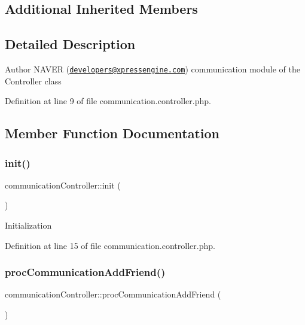 \subsection*{Additional Inherited Members}


\subsection{Detailed Description}
\begin{DoxyAuthor}{Author}
N\+A\+V\+ER (\href{mailto:developers@xpressengine.com}{\tt developers@xpressengine.\+com}) communication module of the Controller class 
\end{DoxyAuthor}


Definition at line 9 of file communication.\+controller.\+php.



\subsection{Member Function Documentation}
\mbox{\label{classcommunicationController_ae0bac4165bbba7f134ef74749c58f0df}} 
\subsubsection{\texorpdfstring{init()}{init()}}
{\footnotesize\ttfamily communication\+Controller\+::init (\begin{DoxyParamCaption}{ }\end{DoxyParamCaption})}

Initialization 

Definition at line 15 of file communication.\+controller.\+php.

\mbox{\label{classcommunicationController_a0d40e483d00a2b041578ad974fb3a5b5}} 
\subsubsection{\texorpdfstring{proc\+Communication\+Add\+Friend()}{procCommunicationAddFriend()}}
{\footnotesize\ttfamily communication\+Controller\+::proc\+Communication\+Add\+Friend (\begin{DoxyParamCaption}{ }\end{DoxyParamCaption})}

